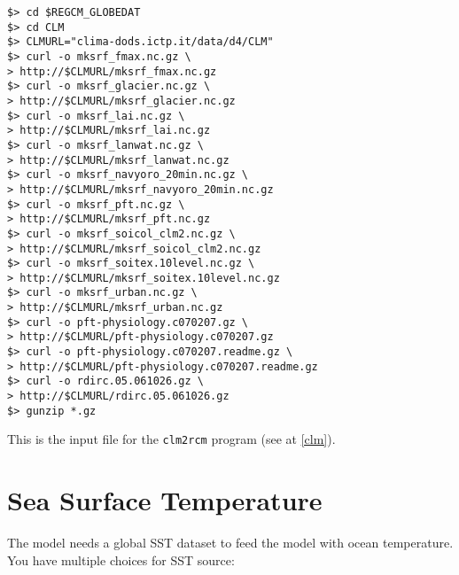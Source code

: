 \begin{Verbatim}
$> cd $REGCM_GLOBEDAT
$> cd CLM
$> CLMURL="clima-dods.ictp.it/data/d4/CLM"
$> curl -o mksrf_fmax.nc.gz \
> http://$CLMURL/mksrf_fmax.nc.gz
$> curl -o mksrf_glacier.nc.gz \
> http://$CLMURL/mksrf_glacier.nc.gz
$> curl -o mksrf_lai.nc.gz \
> http://$CLMURL/mksrf_lai.nc.gz
$> curl -o mksrf_lanwat.nc.gz \
> http://$CLMURL/mksrf_lanwat.nc.gz
$> curl -o mksrf_navyoro_20min.nc.gz \
> http://$CLMURL/mksrf_navyoro_20min.nc.gz
$> curl -o mksrf_pft.nc.gz \
> http://$CLMURL/mksrf_pft.nc.gz
$> curl -o mksrf_soicol_clm2.nc.gz \
> http://$CLMURL/mksrf_soicol_clm2.nc.gz
$> curl -o mksrf_soitex.10level.nc.gz \
> http://$CLMURL/mksrf_soitex.10level.nc.gz
$> curl -o mksrf_urban.nc.gz \
> http://$CLMURL/mksrf_urban.nc.gz
$> curl -o pft-physiology.c070207.gz \
> http://$CLMURL/pft-physiology.c070207.gz
$> curl -o pft-physiology.c070207.readme.gz \
> http://$CLMURL/pft-physiology.c070207.readme.gz
$> curl -o rdirc.05.061026.gz \
> http://$CLMURL/rdirc.05.061026.gz
$> gunzip *.gz
\end{Verbatim}

This is the input file for the \verb=clm2rcm= program (see at \ref{clm}).

\section{Sea Surface Temperature}

The model needs a global SST dataset to feed the model with ocean temperature.
You have multiple choices for SST source:

